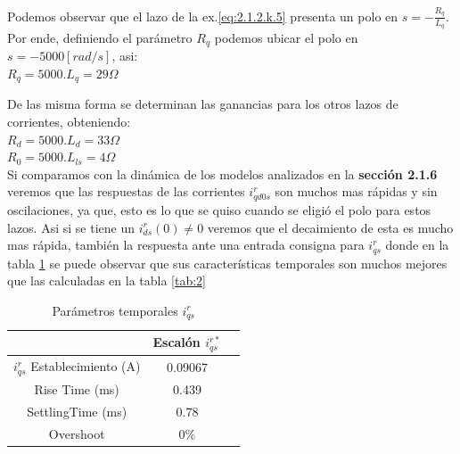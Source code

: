 \documentclass[10pt]{article}
\begin{document}
\begin{itemize}
	Podemos observar que el lazo de la ex.\ref{eq:2.1.2.k.5} presenta un polo en $s=-\frac{R_{q}}{L_{q}}$. Por ende, definiendo el parámetro $R_{q}$ podemos ubicar el polo en $s=-5000[rad/s]$, asi:\\
	$R_{q}=5000 . L_{q}=29\Omega$
	
	De las misma forma se determinan las ganancias para los otros lazos de corrientes, obteniendo:\\
	$R_{d}=5000 . L_{d}=33\Omega$\\
	$R_{0}=5000 . L_{ls}=4\Omega$\\
	
	Si comparamos con la dinámica de los modelos analizados en la \textbf{sección 2.1.6} veremos que las respuestas de las corrientes $i^{r}_{qd0s}$ son muchos mas rápidas y sin oscilaciones, ya que, esto es lo que se quiso cuando se eligió el polo para estos lazos. Asi si se tiene un $i^{r}_{ds}(0)\neq 0$ veremos que el decaimiento de esta es mucho mas rápida, también la respuesta ante una entrada consigna para $i^{r}_{qs}$ donde en la tabla \ref{tab:3} se puede observar que sus características temporales son muchos mejores que las calculadas en la tabla \ref{tab:2}
		\begin{table}[!h]
	\begin{center}
	\begin{tabular}{| c | c | c | }
	\hline
	  & Escalón $i^{r*}_{qs}$\\ \hline
	 $ i^{r}_{qs}$ Establecimiento (A) &   0.09067 \\ \hline
	 Rise Time (ms) &  0.439\\ \hline
	SettlingTime (ms)& 0.78\\ \hline
	Overshoot &0$\%$ \\ \hline
	\end{tabular}
	\caption{Parámetros temporales $i^{r}_{qs}$}
	\label{tab:3}
	\end{center}
	\end{table}
	

\end{itemize}
\end{document}
